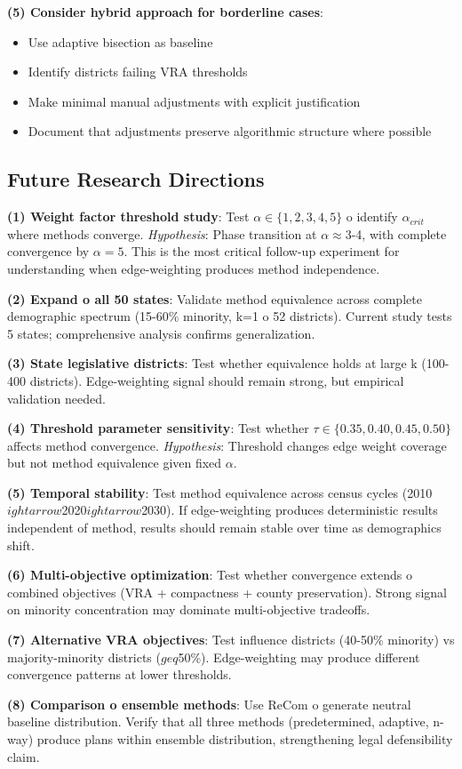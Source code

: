 \textbf{(5) Consider hybrid approach for borderline cases}:
\begin{itemize}
\item Use adaptive bisection as baseline
\item Identify districts failing VRA thresholds
\item Make minimal manual adjustments with explicit justification
\item Document that adjustments preserve algorithmic structure where possible
\end{itemize}

\subsection{Future Research Directions}

\textbf{(1) Weight factor threshold study}: Test $\alpha \in \{1, 2, 3, 4, 5\}$ 	o identify $\alpha_{crit}$ where methods converge. \textit{Hypothesis}: Phase transition at $\alpha \approx 3$-4, with complete convergence by $\alpha = 5$. This is the most critical follow-up experiment for understanding when edge-weighting produces method independence.

\textbf{(2) Expand 	o all 50 states}: Validate method equivalence across complete demographic spectrum (15-60\% minority, k=1 	o 52 districts). Current study tests 5 states; comprehensive analysis confirms generalization.

\textbf{(3) State legislative districts}: Test whether equivalence holds at large k (100-400 districts). Edge-weighting signal should remain strong, but empirical validation needed.

\textbf{(4) Threshold parameter sensitivity}: Test whether $\tau \in \{0.35, 0.40, 0.45, 0.50\}$ affects method convergence. \textit{Hypothesis}: Threshold changes edge weight coverage but not method equivalence given fixed $\alpha$.

\textbf{(5) Temporal stability}: Test method equivalence across census cycles (2010$
ightarrow$2020$
ightarrow$2030). If edge-weighting produces deterministic results independent of method, results should remain stable over time as demographics shift.

\textbf{(6) Multi-objective optimization}: Test whether convergence extends 	o combined objectives (VRA + compactness + county preservation). Strong signal on minority concentration may dominate multi-objective tradeoffs.

\textbf{(7) Alternative VRA objectives}: Test influence districts (40-50\% minority) vs majority-minority districts ($geq$50\%). Edge-weighting may produce different convergence patterns at lower thresholds.

\textbf{(8) Comparison 	o ensemble methods}: Use ReCom 	o generate neutral baseline distribution. Verify that all three methods (predetermined, adaptive, n-way) produce plans within ensemble distribution, strengthening legal defensibility claim.
